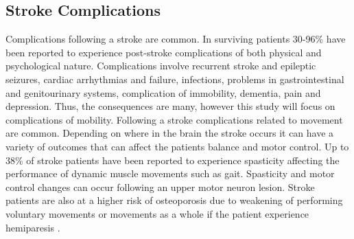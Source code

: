 \subsection{Stroke Complications}
Complications following a stroke are common. In surviving patients 30-96\% have been reported to experience post-stroke complications of both physical and psychological nature. Complications involve recurrent stroke and epileptic seizures, cardiac arrhythmias and failure, infections, problems in gastrointestinal and genitourinary systems, complication of immobility, dementia, pain and depression.  \cite{Bhalla2016} %
Thus, the consequences are many, however this study will focus on complications of mobility. Following a stroke complications related to movement are common. Depending on where in the brain the stroke occurs it can have a variety of outcomes that can affect the patients balance and motor control. Up to 38\% of stroke patients have been reported to experience spasticity affecting the performance of dynamic muscle movements such as gait. Spasticity and motor control changes can occur following an upper motor neuron lesion. \cite{Bhalla2016} %
Stroke patients are also at a higher risk of osteoporosis due to weakening of performing voluntary movements or movements as a whole if the patient experience hemiparesis \cite{Bhalla2016}.
